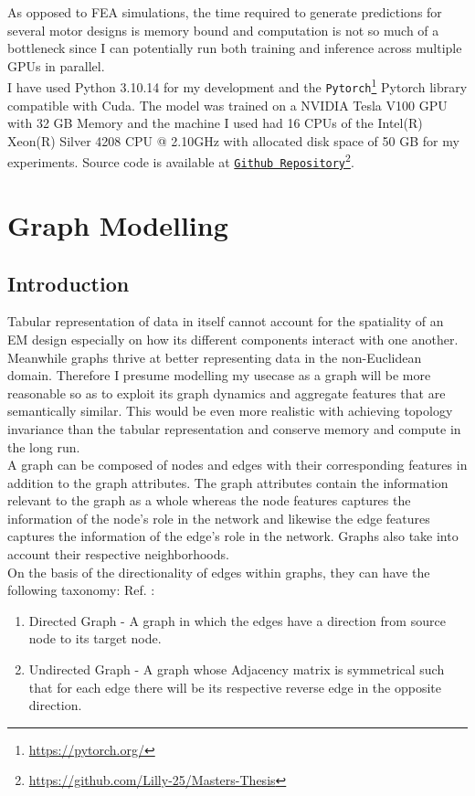 \documentclass{report} %
\begin{document}
As opposed to \ac{FEA} simulations, the time required to generate predictions for several motor designs is memory bound 
and computation is not so much of a bottleneck since I can potentially run both training and inference across multiple GPUs in parallel.\\

I have used Python 3.10.14 for my development and the \texttt{Pytorch}\footnote{\url{https://pytorch.org/}} Pytorch library compatible with Cuda.
The model was trained on a NVIDIA Tesla V100 \ac{GPU} with 32 GB Memory and the machine I used had 16 CPUs of the Intel(R) Xeon(R) Silver 4208 CPU @ 2.10GHz 
with allocated disk space of 50 GB for my experiments.
Source code is available at \texttt{\href{https://github.com/Lilly-25/Masters-Thesis}{Github Repository}}\footnote{\url{https://github.com/Lilly-25/Masters-Thesis}}.

\chapter{Graph Modelling} 

\section{Introduction}\label{sec:Introduction}

Tabular representation of data in itself cannot account for the spatiality of an \ac{EM} design especially on how its different components interact with one another. 
Meanwhile graphs thrive at better representing data in the non-Euclidean domain.
Therefore I presume modelling my usecase as a graph will be more reasonable so as to exploit its graph dynamics and aggregate features that are semantically similar.
This would be even more realistic with achieving topology invariance than the tabular representation and conserve memory and compute in the long run.\\

A graph can be composed of nodes and edges with their corresponding features in addition to the graph attributes.
The graph attributes contain the information relevant to the graph as a whole whereas the node features captures the information of the node's role in the network and 
likewise the edge features captures the information of the edge's role in the network. Graphs also take into account their respective neighborhoods.\\

On the basis of the directionality of edges within graphs, they can have the following taxonomy: Ref. \cite{GNN-2019}:
\begin{enumerate}[nosep]
    \item Directed Graph - A graph in which the edges have a direction from source node to its target node.
    \item Undirected Graph - A graph whose Adjacency matrix is symmetrical such that for each edge there will be its respective reverse edge in the opposite direction.
\end{enumerate}
\end{document}
